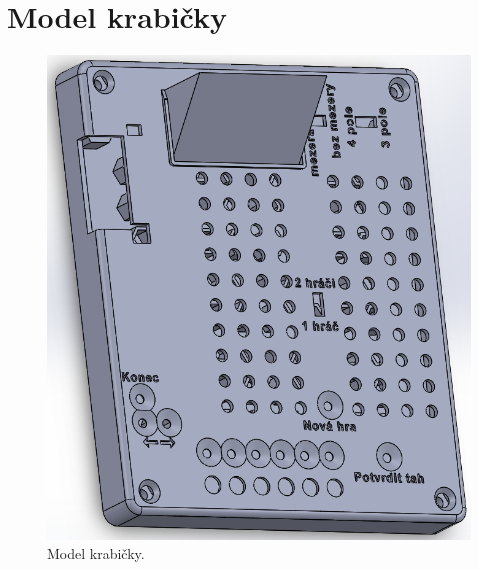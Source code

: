   \chapter{Model krabičky}
  \begin{figure}[!h]
    \begin{center}
      \includegraphics[scale=0.8]{prilohy/Krabicka_SolidWorks.png}
    \end{center}
    \caption[Model krabičky]{Model krabičky.}
  \end{figure}

